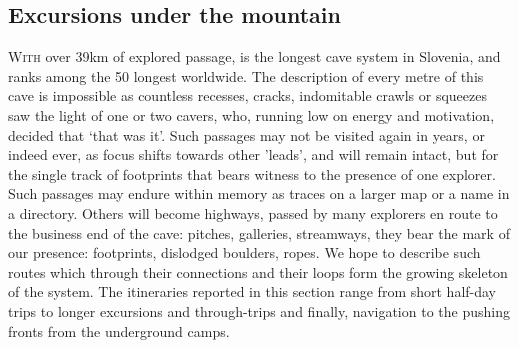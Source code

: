 \begin{tcolorbox}
	\vspace{60pt}
	\part{Excursions under the mountain}
	\lettrine{W}{ith} over 39km of explored passage,  is the longest cave system in Slovenia, and ranks among the 50 longest worldwide. The description of every metre of this cave is impossible as countless recesses, cracks, indomitable crawls or squeezes saw the light of one or two cavers, who, running low on energy and motivation, decided that `that was it'. Such passages may not be visited again in years, or indeed ever, as focus shifts towards other 'leads', and will remain intact, but for the single track of footprints that bears witness to the presence of one explorer. Such passages may endure within memory as traces on a larger map or a name in a directory. Others will become highways, passed by many explorers en route to the business end of the cave: pitches, galleries, streamways, they bear the mark of our presence: footprints, dislodged boulders, ropes. We hope to describe such routes which through their connections and their loops form the growing skeleton of the system. The itineraries reported in this section range from short half-day trips  to longer excursions and through-trips and finally, navigation to the pushing fronts from the underground camps.
\end{tcolorbox}

	
\BgThispage
